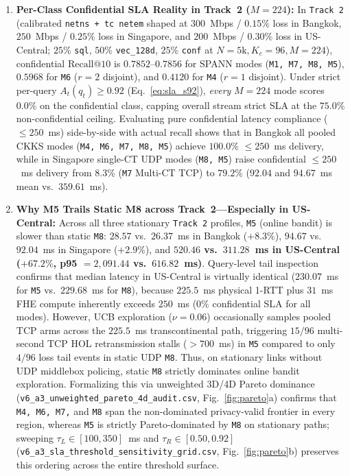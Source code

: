 \documentclass[10pt,journal,compsoc]{IEEEtran}
\begin{document}
\begin{enumerate}
    \item \textbf{Per-Class Confidential SLA Reality in Track~2 ($M=224$):} In \texttt{Track~2} (calibrated \texttt{netns + tc netem} shaped at $300$~Mbps / $0.15\%$ loss in Bangkok, $250$~Mbps / $0.25\%$ loss in Singapore, and $200$~Mbps / $0.30\%$ loss in US-Central; $25\%$ \texttt{sql}, $50\%$ \nolinkurl{vec_128d}, $25\%$ \texttt{conf} at $N=5\text{k}, K_c=96, M=224$), confidential $\mathrm{Recall}@10$ is $0.7852\text{--}0.7856$ for SPANN modes (\texttt{M1, M7, M8, M5}), $0.5968$ for \texttt{M6} ($r=2$ disjoint), and $0.4120$ for \texttt{M4} ($r=1$ disjoint). Under strict per-query $A_t(q_t) \ge 0.92$ (Eq.~\ref{eq:sla_s92}), \emph{every} $M=224$ mode scores $0.0\%$ on the confidential class, capping overall stream strict SLA at the $75.0\%$ non-confidential ceiling. Evaluating pure confidential latency compliance ($\le 250$~ms) side-by-side with actual recall shows that in Bangkok all pooled CKKS modes (\texttt{M4, M6, M7, M8, M5}) achieve $100.0\%$ $\le 250$~ms delivery, while in Singapore single-CT UDP modes (\texttt{M8, M5}) raise confidential $\le 250$~ms delivery from $8.3\%$ (\texttt{M7} Multi-CT TCP) to $79.2\%$ ($92.04$ and $94.67$~ms mean vs.\ $359.61$~ms).
    \item \textbf{Why M5 Trails Static M8 across Track~2---Especially in US-Central:} Across all three stationary \texttt{Track~2} profiles, \texttt{M5} (online bandit) is slower than static \texttt{M8}: $28.57$ vs.\ $26.37$~ms in Bangkok ($+8.3\%$), $94.67$ vs.\ $92.04$~ms in Singapore ($+2.9\%$), and \textbf{$520.46$ vs.\ $311.28$~ms in US-Central ($+67.2\%$, p95 $= 2{,}091.44$ vs.\ $616.82$~ms)}. Query-level tail inspection confirms that median latency in US-Central is virtually identical ($230.07$~ms for \texttt{M5} vs.\ $229.68$~ms for \texttt{M8}), because $225.5$~ms physical 1-RTT plus $31$~ms FHE compute inherently exceeds $250$~ms ($0\%$ confidential SLA for all modes). However, UCB exploration ($\nu=0.06$) occasionally samples pooled TCP arms across the $225.5$~ms transcontinental path, triggering $15/96$ multi-second TCP HOL retransmission stalls ($>700$~ms) in \texttt{M5} compared to only $4/96$ loss tail events in static UDP \texttt{M8}. Thus, on stationary links without UDP middlebox policing, static \texttt{M8} strictly dominates online bandit exploration. Formalizing this via unweighted 3D/4D Pareto dominance (\nolinkurl{v6_a3_unweighted_pareto_4d_audit.csv}, Fig.~\ref{fig:pareto}a) confirms that \texttt{M4, M6, M7,} and \texttt{M8} span the non-dominated privacy-valid frontier in every region, whereas \texttt{M5} is strictly Pareto-dominated by \texttt{M8} on stationary paths; sweeping $\tau_L \in [100,350]$~ms and $\tau_R \in [0.50,0.92]$ (\nolinkurl{v6_a3_sla_threshold_sensitivity_grid.csv}, Fig.~\ref{fig:pareto}b) preserves this ordering across the entire threshold surface.
\end{enumerate}
\end{document}
